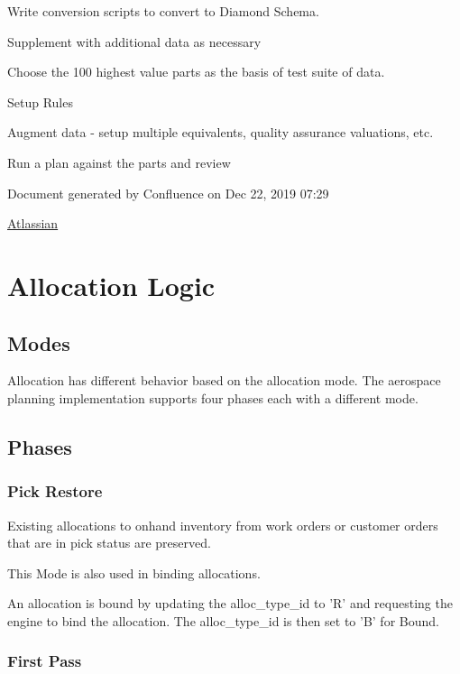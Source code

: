 \documentclass[letterpaper,10pt,english]{sphinxmanual}
\begin{document}
Write conversion scripts to convert to Diamond Schema.

Supplement with additional data as necessary

Choose the 100 highest value parts as the basis of test suite of data.

Setup Rules

Augment data - setup multiple equivalents, quality assurance valuations,
etc.

Run a plan against the parts and review

Document generated by Confluence on Dec 22, 2019 07:29

\href{http://www.atlassian.com/}{Atlassian}


\chapter{Allocation Logic}
\label{APS/AllocationLogic::doc}\label{APS/AllocationLogic:allocation-logic}

\section{Modes}
\label{APS/AllocationLogic:modes}
Allocation has different behavior based on the allocation mode. The
aerospace planning implementation supports four phases each with a
different mode.


\section{Phases}
\label{APS/AllocationLogic:phases}

\subsection{Pick Restore}
\label{APS/AllocationLogic:pick-restore}
Existing allocations to onhand inventory from work orders or customer
orders that are in pick status are preserved.

This Mode is also used in binding allocations.

An allocation is bound by updating the alloc\_type\_id to ’R’ and
requesting the engine to bind the allocation. The alloc\_type\_id is
then set to ’B’ for Bound.


\subsection{First Pass}
\label{APS/AllocationLogic:first-pass}
\end{document}
